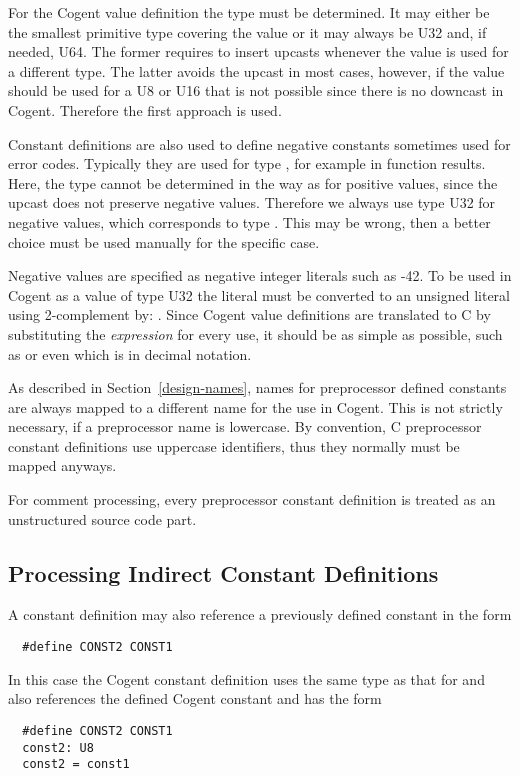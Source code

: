 For the Cogent value definition the type must be determined. It may either be the smallest primitive type covering the value 
or it may always be U32 and, if needed, U64. The former requires to insert upcasts whenever the value is used for a different 
type. The latter avoids the upcast in most cases, however, if the value should be used for a U8 or U16 that is not possible 
since there is no downcast in Cogent. Therefore the first approach is used.

Constant definitions are also used to define negative constants sometimes used for error codes. Typically they are used for 
type , for example in function results. Here, the type cannot be determined in the way as for positive values, since the 
upcast does not preserve negative values. Therefore we always use type U32 for negative values, which corresponds to type 
. This may be wrong, then a better choice must be used manually for the specific case.

Negative values are specified as negative integer literals such as -42. To be used in 
Cogent as a value of type U32 the literal must be converted to an unsigned literal using 2-complement by: 
.
Since Cogent value definitions are translated to C by substituting the \textit{expression} for every use, it should be as 
simple as possible, such as  or even  which is  in decimal notation.

As described in Section~\ref{design-names}, names for preprocessor defined constants are always mapped to a different
name for the use in Cogent. This is not strictly necessary, if a preprocessor name is lowercase. By convention, C preprocessor 
constant definitions use uppercase identifiers, thus they normally must be mapped anyways.

For comment processing, every preprocessor constant definition is treated as an unstructured source code part.

\subsection{Processing Indirect Constant Definitions}

A constant definition may also reference a previously defined constant in the form 
\begin{verbatim}
  #define CONST2 CONST1
\end{verbatim}

In this case the Cogent constant definition uses the same type as that for  and
also references the defined Cogent constant and has the form
\begin{verbatim}
  #define CONST2 CONST1
  const2: U8
  const2 = const1
\end{verbatim}

